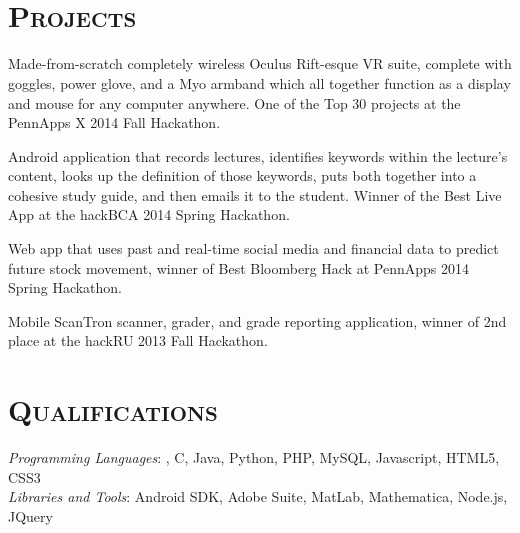 \begin{resume}
\begin{formatb}
  \\
  \body\\
\end{formatb}

\section{\textsc{Projects}}

\begin{position}
Made-from-scratch completely wireless Oculus Rift-esque VR suite, complete with goggles, power glove, and a Myo armband which all together function as a display and mouse for any computer anywhere. One of the Top 30 projects at the PennApps X 2014 Fall Hackathon.
\end{position}

\begin{position}
Android application that records lectures, identifies keywords within the lecture's content, looks up the definition of those keywords, puts both together into a cohesive study guide, and then emails it to the student. Winner of the Best Live App at the hackBCA 2014 Spring Hackathon. 
\end{position}

\begin{position}
Web app that uses past and real-time social media and financial data to predict future stock movement, winner of Best Bloomberg Hack at PennApps 2014 Spring Hackathon.
\end{position}

\begin{position}
Mobile ScanTron scanner, grader, and grade reporting application, winner of 2nd place at the hackRU 2013 Fall Hackathon.
\end{position}

\section{\textsc{Qualifications}}

\emph{Programming Languages}: \Cplusplus, C, Java, Python, PHP, MySQL, Javascript, HTML5, CSS3 \\
\emph{Libraries and Tools}: Android SDK, Adobe Suite, MatLab, Mathematica, Node.js, JQuery


\end{resume}
